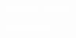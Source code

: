 \documentclass[aspectratio=169,t]{beamer}
\begin{document}
\chapterIntroConfig
\begin{slide}{ }
 \begin{center}
 \textcolor{white}{
 \huge
 \textbf{Thank You!}\\ \vspace{6pt}
 \normalsize
 Questions?}
 \end{center}
\end{slide}
\end{document}
